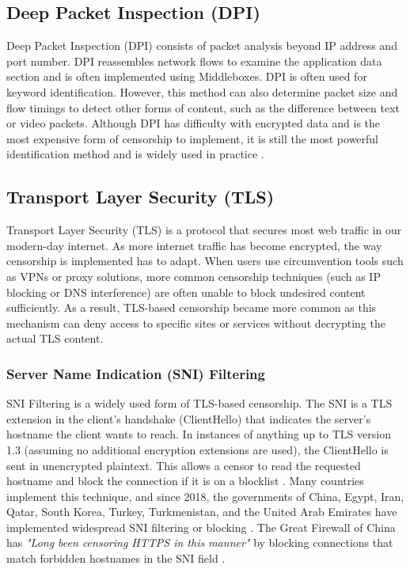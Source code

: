 \subsection{Deep Packet Inspection (DPI)}

Deep Packet Inspection (DPI) consists of packet analysis beyond IP address and port number. DPI reassembles network flows to examine the application data section and is often implemented using Middleboxes. DPI is often used for keyword identification. However, this method can also determine packet size and flow timings to detect other forms of content, such as the difference between text or video packets. Although DPI has difficulty with encrypted data and is the most expensive form of censorship to implement, it is still the most powerful identification method and is widely used in practice \cite{rfc9505}.

\subsection{Transport Layer Security (TLS)}

Transport Layer Security (TLS) is a protocol that secures most web traffic in our modern-day internet. As more internet traffic has become encrypted, the way censorship is implemented has to adapt. When users use circumvention tools such as VPNs or proxy solutions, more common censorship techniques (such as IP blocking or DNS interference) are often unable to block undesired content sufficiently. As a result, TLS-based censorship became more common as this mechanism can deny access to specific sites or services without decrypting the actual TLS content. 

\subsubsection{Server Name Indication (SNI) Filtering}

SNI Filtering is a widely used form of TLS-based censorship. The SNI is a TLS extension in the client's handshake (ClientHello) that indicates the server's hostname the client wants to reach. In instances of anything up to TLS version 1.3 (assuming no additional encryption extensions are used), the ClientHello is sent in unencrypted plaintext. This allows a censor to read the requested hostname and block the connection if it is on a blocklist \cite{SNIUnencryptedCloudFlare}. Many countries implement this technique, and since 2018, the governments of China, Egypt, Iran, Qatar, South Korea, Turkey, Turkmenistan, and the United Arab Emirates have implemented widespread SNI filtering or blocking \cite{rfc9505SNIBlocking}. The Great Firewall of China has \textit{"Long been censoring HTTPS in this manner"} by blocking connections that match forbidden hostnames in the SNI field \cite{GreatFirewallSNI}. 

